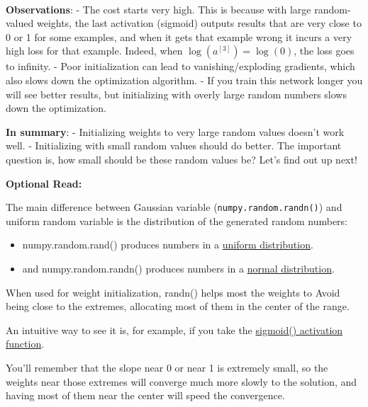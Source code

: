 \documentclass[11pt]{article}
\providecommand{\tightlist}{%
      \setlength{\itemsep}{0pt}\setlength{\parskip}{0pt}}
\begin{document}
    \begin{center}
    \end{center}
    { \hspace*{\fill} \\}
    
    \textbf{Observations}: - The cost starts very high. This is because with
large random-valued weights, the last activation (sigmoid) outputs
results that are very close to 0 or 1 for some examples, and when it
gets that example wrong it incurs a very high loss for that example.
Indeed, when \(\log(a^{[3]}) = \log(0)\), the loss goes to infinity. -
Poor initialization can lead to vanishing/exploding gradients, which
also slows down the optimization algorithm. - If you train this network
longer you will see better results, but initializing with overly large
random numbers slows down the optimization.

\textbf{In summary}: - Initializing weights to very large random values
doesn't work well. - Initializing with small random values should do
better. The important question is, how small should be these random
values be? Let's find out up next!

\textbf{Optional Read:}

The main difference between Gaussian variable
(\texttt{numpy.random.randn()}) and uniform random variable is the
distribution of the generated random numbers:

\begin{itemize}
\tightlist
\item
  numpy.random.rand() produces numbers in a
  \href{https://raw.githubusercontent.com/jahnog/deeplearning-notes/master/Course2/images/rand.jpg}{uniform
  distribution}.
\item
  and numpy.random.randn() produces numbers in a
  \href{https://raw.githubusercontent.com/jahnog/deeplearning-notes/master/Course2/images/randn.jpg}{normal
  distribution}.
\end{itemize}

When used for weight initialization, randn() helps most the weights to
Avoid being close to the extremes, allocating most of them in the center
of the range.

An intuitive way to see it is, for example, if you take the
\href{https://raw.githubusercontent.com/jahnog/deeplearning-notes/master/Course2/images/sigmoid.jpg}{sigmoid()
activation function}.

You'll remember that the slope near 0 or near 1 is extremely small, so
the weights near those extremes will converge much more slowly to the
solution, and having most of them near the center will speed the
convergence.
\end{document}
